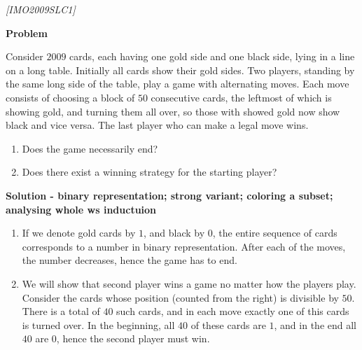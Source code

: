 
%
%

\renewcommand{\theenumi}{\alph{enumi}}




\noindent
 
\filbreak

\begin{problem}
\textit{[IMO2009SLC1]}


\textbf{Problem}

Consider $2009$ cards, each having one gold side and one black side, lying in a line on a long table. Initially all cards show their gold sides. Two players, standing by the same long side of the table, play a game with alternating moves. Each move consists of choosing a block of $50$ consecutive cards, the leftmost of which is showing gold, and turning them all over, so those with showed gold now show black and vice versa. The last player who can make a legal move wins.
\begin{enumerate}
\item Does the game necessarily end?
\item Does there exist a winning strategy for the starting player?
\end{enumerate}


\textbf{Solution - binary representation; strong variant; coloring a subset; analysing whole ws inductuion}
\begin{enumerate}
\item If we denote gold cards by $1$, and black by $0$, the entire sequence of cards  corresponds to a number in binary representation. After each of the moves, the number decreases, hence the game has to end.
\item We will show that second player wins a game no matter how the players play. Consider the cards whose position (counted from the right) is divisible by $50$. There is a total of $40$ such cards, and in each move exactly one of this cards is turned over. In the beginning, all $40$ of these cards are $1$, and in the end all $40$ are $0$, hence the second player must win.
\end{enumerate}
\end{problem}
%

